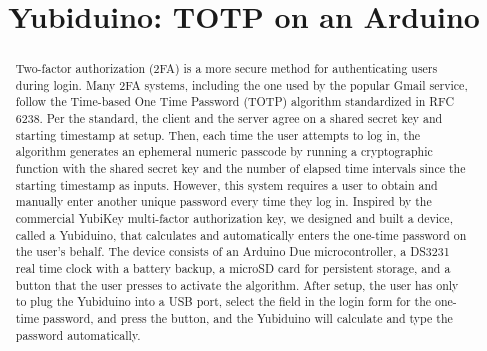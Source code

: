 \documentclass[conference]{IEEEtran}
\begin{document}
%
\title{Yubiduino: TOTP on an Arduino}


\author{
}

\maketitle


\begin{abstract}
Two-factor authorization (2FA) is a more secure method for authenticating users during login. Many 2FA systems, including the one used by the popular Gmail service, follow the Time-based One Time Password (TOTP) algorithm standardized in RFC 6238. Per the standard, the client and the server agree on a shared secret key and starting timestamp at setup. Then, each time the user attempts to log in, the algorithm generates an ephemeral numeric passcode by running a cryptographic function with the shared secret key and the number of elapsed time intervals since the starting timestamp as inputs. However, this system requires a user to obtain and manually enter another unique password every time they log in. Inspired by the commercial YubiKey multi-factor authorization key, we designed and built a device, called a Yubiduino, that calculates and automatically enters the one-time password on the user's behalf. The device consists of an Arduino Due microcontroller, a DS3231 real time clock with a battery backup, a microSD card for persistent storage, and a button that the user presses to activate the algorithm. After setup, the user has only to plug the Yubiduino into a USB port, select the field in the login form for the one-time password, and press the button, and the Yubiduino will calculate and type the password automatically.

\end{abstract}
\end{document}

